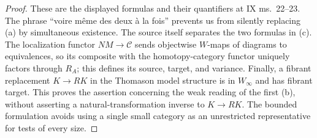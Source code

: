 \begin{proof}
These are the displayed formulas and their quantifiers at IX ms.~22--23.
The phrase ``voire m\^eme des deux \`a la fois'' prevents us from silently
replacing (a) by simultaneous existence. The source itself separates the
two formulas in (c). The localization functor $NM\to\mathcal C$ sends
objectwise $W$-maps of diagrams to equivalences, so its composite with
the homotopy-category functor uniquely factors through $R_A$; this
defines its source, target, and variance. Finally, a fibrant replacement
$K\to RK$ in the Thomason model structure is in $W_\infty$ and has
fibrant target. This proves the assertion concerning the weak reading of
the first (b), without asserting a natural-transformation inverse to
$K\to RK$. The bounded formulation avoids using a single small
category as an unrestricted representative for tests of every size.
\end{proof}

